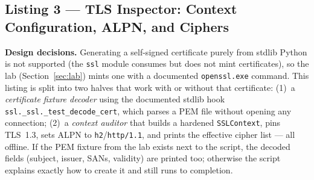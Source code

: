 \subsection{Listing 3 --- TLS Inspector: Context Configuration, ALPN, and Ciphers}

\textbf{Design decisions.} Generating a self-signed certificate purely from stdlib Python is not supported (the \texttt{ssl} module consumes but does not mint certificates), so the lab (Section~\ref{sec:lab}) mints one with a documented \texttt{openssl.exe} command. This listing is split into two halves that work with or without that certificate: (1)~a \emph{certificate fixture decoder} using the documented stdlib hook \texttt{ssl.\_ssl.\_test\_decode\_cert}, which parses a PEM file without opening any connection; (2)~a \emph{context auditor} that builds a hardened \texttt{SSLContext}, pins TLS~1.3, sets ALPN to \texttt{h2}/\texttt{http/1.1}, and prints the effective cipher list --- all offline. If the PEM fixture from the lab exists next to the script, the decoded fields (subject, issuer, SANs, validity) are printed too; otherwise the script explains exactly how to create it and still runs to completion.

